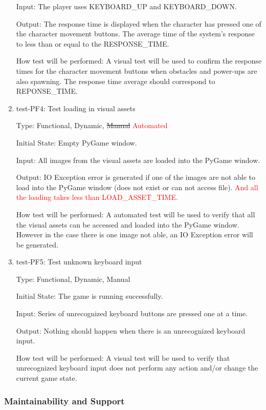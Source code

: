 \documentclass[12pt, titlepage]{article}
\begin{document}
\begin{enumerate}
Input: The player uses KEYBOARD\_UP and KEYBOARD\_DOWN.
					
Output: The response time is displayed when the character has pressed one of the character movement buttons. The average time of the system's response to less than or equal to the RESPONSE\_TIME.
					
How test will be performed: A visual test will be used to confirm the response times for the character movement buttons when obstacles and power-ups are also spawning. The response time average should correspond to REPONSE\_TIME. 

\item{test-PF4: Test loading in visual assets \\}

Type: Functional, Dynamic, \sout{Manual} \textcolor{red}{Automated}
					
Initial State: Empty PyGame window.

Input: All images from the visual assets are loaded into the PyGame window.
					
Output: IO Exception error is generated if one of the images are not able to load into the PyGame window (does not exist or can not access file). \textcolor{red}{And all the loading takes less than LOAD\_ASSET\_TIME.}
					
How test will be performed: A automated test will be used to verify that all the visual assets can be accessed and loaded into the PyGame window. However in the case there is one image not able,  an IO Exception error will be generated.

\item{test-PF5: Test unknown keyboard input \\}

Type: Functional, Dynamic, Manual
					
Initial State: The game is running successfully.

Input: Series of unrecognized keyboard buttons are pressed one at a time.
					
Output: Nothing should happen when there is an unrecognized keyboard input.
					
How test will be performed: A visual test will be used to verify that unrecognized keyboard input does not perform any action and/or change the current game state.

\end{enumerate}

\subsubsection{Maintainability and Support}
\end{document}
